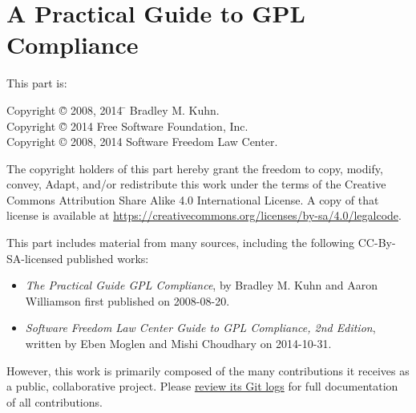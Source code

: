 
\part{A Practical Guide to GPL Compliance}
\label{gpl-compliance-guide}

{\parindent 0in
This part is: \\
\begin{tabbing}
Copyright \= \copyright{} 2008, 2014 \= \hspace{.2in} Bradley M. Kuhn. \\
Copyright \= \copyright{} 2014 \> \hspace{.2in} Free Software Foundation, Inc. \\
Copyright \> \copyright{} 2008, 2014 \> \hspace{.2in} Software Freedom Law Center. \\
\end{tabbing}

\vspace{.1in}

\begin{center}
The copyright holders of this part hereby grant the freedom to copy, modify,
convey, Adapt, and/or redistribute this work under the terms of the Creative
Commons Attribution Share Alike 4.0 International License.  A copy of that
license is available at
\url{https://creativecommons.org/licenses/by-sa/4.0/legalcode}.

\vfill

This part includes material from many sources, including the following
CC-By-SA-licensed published works: \\

\begin{itemize}
\item \textit{The Practical Guide GPL Compliance}, by Bradley M. Kuhn and Aaron
Williamson first published on 2008-08-20. \\
\item \textit{Software Freedom Law Center Guide to GPL Compliance, 2nd
  Edition}, written by Eben Moglen and Mishi Choudhary on 2014-10-31. \\
\end{itemize}

However, this work is primarily composed of the many contributions it
receives as a public, collaborative project.  Please
\href{https://gitorious.org/copyleft-org/tutorial/history/master:compliance-guide.tex}{review
  its Git logs} for full documentation of all contributions.

\end{center}
}

